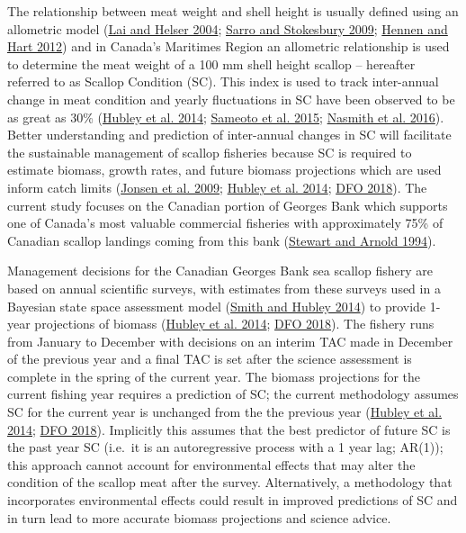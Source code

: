 \documentclass[
]{article}
\begin{document}
The relationship between meat weight and shell height is usually defined using an allometric model (\protect\hyperlink{ref-laiLinearMixedeffectsModels2004}{Lai and Helser 2004}; \protect\hyperlink{ref-sarroSpatialTemporalVariation2009}{Sarro and Stokesbury 2009}; \protect\hyperlink{ref-hennenShellHeightToWeightRelationships2012}{Hennen and Hart 2012}) and in Canada's Maritimes Region an allometric relationship is used to determine the meat weight of a 100 mm shell height scallop -- hereafter referred to as Scallop Condition (SC). This index is used to track inter-annual change in meat condition and yearly fluctuations in SC have been observed to be as great as 30\% (\protect\hyperlink{ref-hubleyGeorgesBankBrowns2014}{Hubley et al. 2014}; \protect\hyperlink{ref-sameotoScallopFishingArea2015}{Sameoto et al. 2015}; \protect\hyperlink{ref-nasmithScallopProductionAreas2016}{Nasmith et al. 2016}). Better understanding and prediction of inter-annual changes in SC will facilitate the sustainable management of scallop fisheries because SC is required to estimate biomass, growth rates, and future biomass projections which are used inform catch limits (\protect\hyperlink{ref-jonsenGeorgesBankScallop2009}{Jonsen et al. 2009}; \protect\hyperlink{ref-hubleyGeorgesBankBrowns2014}{Hubley et al. 2014}; \protect\hyperlink{ref-dfoStockStatusUpdate2018}{DFO 2018}). The current study focuses on the Canadian portion of Georges Bank which supports one of Canada's most valuable commercial fisheries with approximately 75\% of Canadian scallop landings coming from this bank (\protect\hyperlink{ref-stewartEnvironmentalRequirementsSea1994}{Stewart and Arnold 1994}).

Management decisions for the Canadian Georges Bank sea scallop fishery are based on annual scientific surveys, with estimates from these surveys used in a Bayesian state space assessment model (\protect\hyperlink{ref-smithImpactSurveyDesign2014}{Smith and Hubley 2014}) to provide 1-year projections of biomass (\protect\hyperlink{ref-hubleyGeorgesBankBrowns2014}{Hubley et al. 2014}; \protect\hyperlink{ref-dfoStockStatusUpdate2018}{DFO 2018}). The fishery runs from January to December with decisions on an interim TAC made in December of the previous year and a final TAC is set after the science assessment is complete in the spring of the current year. The biomass projections for the current fishing year requires a prediction of SC; the current methodology assumes SC for the current year is unchanged from the the previous year (\protect\hyperlink{ref-hubleyGeorgesBankBrowns2014}{Hubley et al. 2014}; \protect\hyperlink{ref-dfoStockStatusUpdate2018}{DFO 2018}). Implicitly this assumes that the best predictor of future SC is the past year SC (i.e.~it is an autoregressive process with a 1 year lag; AR(1)); this approach cannot account for environmental effects that may alter the condition of the scallop meat after the survey. Alternatively, a methodology that incorporates environmental effects could result in improved predictions of SC and in turn lead to more accurate biomass projections and science advice.
\end{document}
